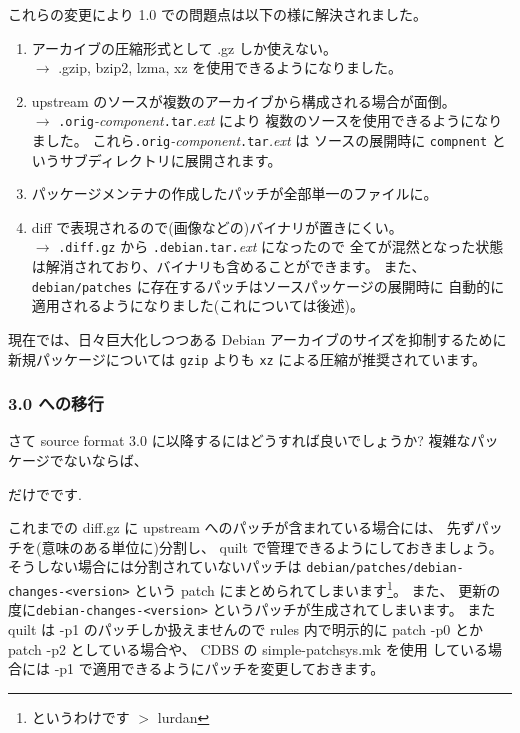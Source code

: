 \documentclass[mingoth,a4paper]{jsarticle}
\begin{document}
%
これらの変更により 1.0 での問題点は以下の様に解決されました。
\begin{enumerate}
      \item アーカイブの圧縮形式として .gz しか使えない。\\
    $\to$ .gzip, bzip2, lzma, xz を使用できるようになりました。
      \item upstream のソースが複数のアーカイブから構成される場合が面倒。\\
    $\to$ {\tt .orig}{\it -component}{\tt .tar}{\it .ext} により
    複数のソースを使用できるようになりました。
    これら{\tt .orig}{\it -component}{\tt .tar}{\it .ext} は
    ソースの展開時に {\tt compnent} というサブディレクトリに展開されます。
      \item パッケージメンテナの作成したパッチが全部単一のファイルに。
      \item diff で表現されるので(画像などの)バイナリが置きにくい。\\
    $\to$ {\tt .diff.gz} から {\tt .debian.tar.}{\it ext} になったので
    全てが混然となった状態は解消されており、バイナリも含めることができます。
    また、 {\tt debian/patches} に存在するパッチはソースパッケージの展開時に
    自動的に適用されるようになりました(これについては後述)。
\end{enumerate}

現在では、日々巨大化しつつある  Debian アーカイブのサイズを抑制するために
新規パッケージについては {\tt gzip} よりも {\tt xz} による圧縮が推奨されています。

\subsubsection{3.0 への移行}

さて source format 3.0 に以降するにはどうすれば良いでしょうか? 
複雑なパッケージでないならば、
\begin{commandline}
\end{commandline}
だけでです. 

これまでの diff.gz に upstream へのパッチが含まれている場合には、
先ずパッチを(意味のある単位に)分割し、
quilt で管理できるようにしておきましょう。
そうしない場合には分割されていないパッチは
{\tt debian/patches/debian-changes-<version>} という
patch にまとめられてしまいます\footnote{というわけです $>$ lurdan}。
また、
更新の度に{\tt debian-changes-<version>} というパッチが生成されてしまいます。
%
また quilt は -p1 のパッチしか扱えませんので rules 内で明示的に patch
-p0 とか patch -p2 としている場合や、 CDBS の simple-patchsys.mk を使用
している場合には -p1 で適用できるようにパッチを変更しておきます。
\end{document}
